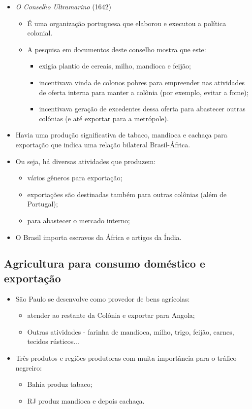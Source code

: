 \documentclass[a4paper,12pt]{article}[abntex2]
\begin{document}
\begin{itemize}
    \item \textit{O Conselho Ultramarino} (1642)
    \begin{itemize}
        \item É uma organização portuguesa que elaborou e executou a política colonial.
        \item A pesquisa em documentos deste conselho mostra que este:
        \begin{itemize}
            \item exigia plantio de cereais, milho, mandioca e feijão;
            \item incentivava vinda de colonos pobres para empreender nas atividades de oferta interna para manter a colônia (por exemplo, evitar a fome);
            \item incentivava geração de excedentes dessa oferta para abastecer outras colônias (e até exportar para a metrópole).
        \end{itemize}
    \end{itemize}
    \item Havia uma produção significativa de tabaco, mandioca e cachaça para exportação que indica uma relação bilateral Brasil-África.
    \item Ou seja, há diversas atividades que produzem:
    \begin{itemize}
        \item vários gêneros para exportação;
        \item exportações são destinadas também para outras colônias (além de Portugal);
        \item para abastecer o mercado interno;
    \end{itemize}
    \item O Brasil importa escravos da África e artigos da Índia.
\end{itemize}

\subsection{\textbf{Agricultura para consumo doméstico e exportação}}

\begin{itemize}
    \item São Paulo se desenvolve como provedor de bens agrícolas:
    \begin{itemize}
        \item atender ao restante da Colônia e exportar para Angola;
        \item Outras atividades - farinha de mandioca, milho, trigo, feijão, carnes, tecidos rústicos...
    \end{itemize}
    \item Três produtos e regiões produtoras com muita importância para o tráfico negreiro:
    \begin{itemize}
        \item Bahia produz tabaco;
        \item RJ produz mandioca e depois cachaça.
    \end{itemize}
\end{itemize}
\end{document}

